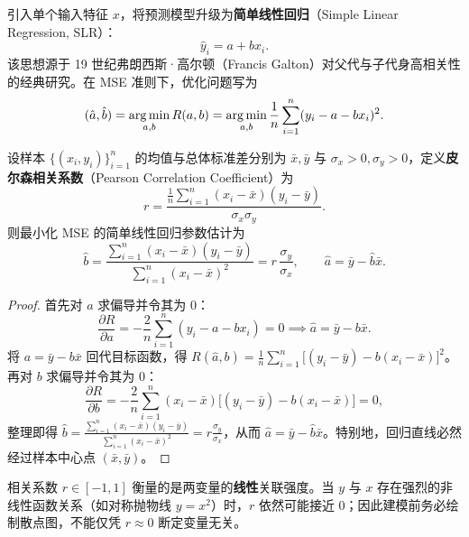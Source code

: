 引入单个输入特征 $x$，将预测模型升级为\textbf{简单线性回归}（Simple Linear Regression, SLR）：
\[
  \hat{y}_i = a + b x_i.
\]
该思想源于 19 世纪弗朗西斯·高尔顿（Francis Galton）对父代与子代身高相关性的经典研究。在 MSE 准则下，优化问题写为
\[
  (\hat{a}, \hat{b}) = \operatorname*{arg\,min}_{a, b} R(a, b) = \operatorname*{arg\,min}_{a, b} \frac{1}{n}\sum_{i=1}^{n}(y_i - a - b x_i)^2.
\]

\begin{theorem}[简单线性回归的闭式解]\label{thm:slr-closed-form}
设样本 $\{(x_i, y_i)\}_{i=1}^{n}$ 的均值与总体标准差分别为 $\bar{x}, \bar{y}$ 与 $\sigma_x > 0, \sigma_y > 0$，定义\textbf{皮尔森相关系数}（Pearson Correlation Coefficient）为
\begin{equation}\label{eq:pearson-r}
  r = \frac{\frac{1}{n}\sum_{i=1}^{n}(x_i - \bar{x})(y_i - \bar{y})}{\sigma_x \sigma_y}.
\end{equation}
则最小化 MSE 的简单线性回归参数估计为
\begin{equation}\label{eq:slr-solution}
  \hat{b} = \frac{\sum_{i=1}^{n}(x_i - \bar{x})(y_i - \bar{y})}{\sum_{i=1}^{n}(x_i - \bar{x})^2} = r\,\frac{\sigma_y}{\sigma_x},\qquad
  \hat{a} = \bar{y} - \hat{b}\bar{x}.
\end{equation}
\end{theorem}

\begin{proof}
首先对 $a$ 求偏导并令其为 $0$：
\[
  \frac{\partial R}{\partial a} = -\frac{2}{n}\sum_{i=1}^{n}(y_i - a - b x_i) = 0
  \implies \hat{a} = \bar{y} - b\bar{x}.
\]
将 $a = \bar{y} - b\bar{x}$ 回代目标函数，得 $R(\hat{a}, b) = \frac{1}{n}\sum_{i=1}^{n}\bigl[(y_i - \bar{y}) - b(x_i - \bar{x})\bigr]^2$。再对 $b$ 求偏导并令其为 $0$：
\[
  \frac{\partial R}{\partial b} = -\frac{2}{n}\sum_{i=1}^{n}(x_i - \bar{x})\bigl[(y_i - \bar{y}) - b(x_i - \bar{x})\bigr] = 0,
\]
整理即得 $\hat{b} = \frac{\sum_{i=1}^{n}(x_i-\bar{x})(y_i-\bar{y})}{\sum_{i=1}^{n}(x_i-\bar{x})^2} = r\frac{\sigma_y}{\sigma_x}$，从而 $\hat{a} = \bar{y} - \hat{b}\bar{x}$。特别地，回归直线必然经过样本中心点 $(\bar{x}, \bar{y})$。
\end{proof}

\begin{pitfall}[皮尔森相关系数仅刻画线性相关性]\label{pit:pearson-nonlinear}
相关系数 $r\in[-1, 1]$ 衡量的是两变量的\textbf{线性}关联强度。当 $y$ 与 $x$ 存在强烈的非线性函数关系（如对称抛物线 $y=x^2$）时，$r$ 依然可能接近 $0$；因此建模前务必绘制散点图，不能仅凭 $r\approx 0$ 断定变量无关。
\end{pitfall}

